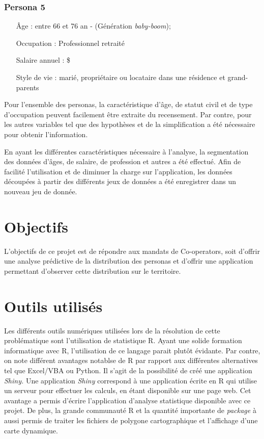 \documentclass[11pt,french]{report}\usepackage[]{graphicx}\usepackage[]{color}
\begin{document}
\subsubsection*{Persona 5}
\begin{itemize}
\item[Âge :] entre 66 et 76 an - (Génération \emph{baby-boom});
\item[Occupation :] Professionnel retraité
\item[Salaire annuel :]  \$
\item[Style de vie : ] marié, propriétaire ou locataire dans une résidence et grand-parents
\end{itemize}
\bigskip

Pour l'ensemble des personas, la caractéristique d'âge, de statut civil et de type d'occupation peuvent facilement être extraite du recensement. Par contre, pour les autres variables tel que  des hypothèses et de la simplification a été nécessaire pour obtenir l'information.
\newline

En ayant les différentes caractéristiques nécessaire à l'analyse, la segmentation des données d'âges, de salaire, de profession et autres a été effectué. Afin de facilité l'utilisation et de diminuer la charge sur l'application, les données découpées à partir des différents jeux de données a été enregistrer dans un nouveau jeu de donnée. 

\section*{Objectifs}
L'objectifs de ce projet est de répondre aux mandats de Co-operators, soit d'offrir une analyse prédictive de la distribution des personas et d'offrir une application permettant d'observer cette distribution sur le territoire.

\section*{Outils utilisés}

Les différents outils numériques utilisées lors de la résolution de cette problématique sont l'utilisation de statistique R. Ayant une solide formation informatique avec R, l'utilisation de ce langage parait plutôt évidante. Par contre, on note différent avantages notablse de R par rapport aux différentes alternatives tel que Excel/VBA ou Python. Il s'agit de la possibilité de créé une application \emph{Shiny.} Une application \emph{Shiny} correspond à une application écrite en R qui utilise un serveur pour effectuer les calculs, en étant disponible sur une page web. Cet avantage a permis d'écrire  l'application d'analyse statistique disponible avec ce projet. De plus, la grande communauté R et la quantité importante de \emph{package} à aussi permis de traiter les fichiers de polygone cartographique et l'affichage d'une carte dynamique. 
\end{document}
